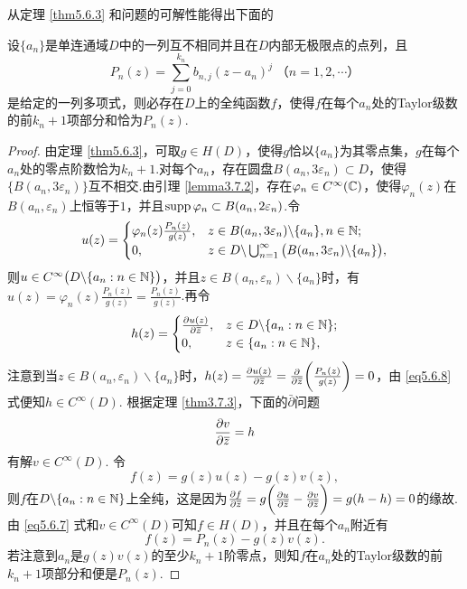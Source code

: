 从定理 \ref{thm5.6.3} 和问题的可解性能得出下面的
\begin{theorem}\label{thm5.6.4}
  设$\{a_n\}$是单连通域$D$中的一列互不相同并且在$D$内部无极限点的点列，且
  \begin{equation}\label{eq5.6.6}
    P_n(z) = \sum_{j=0}^{k_n}b_{n,j}(z-a_n)^j\;\mbox{（$n=1,2,\cdots$）}
  \end{equation}
  是给定的一列多项式，则必存在$D$上的全纯函数$f$，使得$f$在每个$a_n$处的Taylor级数的前$k_n+1$项部分和恰为$P_n(z)$.
\end{theorem}
\begin{proof}
  由定理 \ref{thm5.6.3}，可取$g\in H(D)$，使得$g$恰以$\{a_n\}$为其零点集，$g$在每个$a_n$处的零点阶数恰为$k_n+1$.对每个$a_n$，存在圆盘$B(a_n,3\varepsilon_n)\subset D$，使得$\{B(a_n,3\varepsilon_n)\}$互不相交.由引理 \ref{lemma3.7.2}，存在$\varphi_n\in C^\infty(\mathbb C)$，使得$\varphi_n(z)$在$B(a_n,\varepsilon_n)$上恒等于$1$，并且$\operatorname{supp}\varphi_n\subset B(a_n,2\varepsilon_n)$.令
  \begin{equation}\label{eq5.6.7}
    u(z) = \begin{cases}
     \varphi_n(z)\frac{P_n(z)}{g(z)},&z\in B(a_n,3\varepsilon_n)\backslash\{a_n\},n\in\mathbb N;\\
     0, & z\in D\backslash\bigcup_{n=1}^\infty\big(B(a_n,3\varepsilon_n)\backslash
      \{a_n\}\big),
    \end{cases}
  \end{equation}
  则$u\in C^\infty\big(D\backslash\{a_n:n\in\mathbb N\}\big)$，并且$z\in B(a_n,\varepsilon_n)\backslash\{a_n\}$时，有$u(z)=\varphi_n(z)\frac{P_n(z)}{g(z)}
   =\frac{P_n(z)}{g(z)}$.再令
    \begin{equation} \label{eq5.6.8}
        h(z) = \begin{cases}
        \frac{\partial u(z)}{\partial {}\mkern1mu\overline{\mkern-1muz}}, & z\in D\backslash\{a_n:n\in\mathbb N\};\\
         0, & z\in\{a_n:n\in\mathbb N\},
      \end{cases}
    \end{equation}
  注意到当$z\in B(a_n,\varepsilon_n)\backslash\{a_n\}$时，$h(z)=\frac{\partial u(z)}{\partial {}\mkern1mu\overline{\mkern-1muz}}
  =\frac{\partial }{\partial {}\mkern1mu\overline{\mkern-1muz}}\bigg(\frac{P_n(z)}{g(z)}\bigg)=0$，由 \eqref{eq5.6.8} 式便知$h\in C^\infty(D)$. 根据定理 \ref{thm3.7.3}，下面的$\bar\partial$问题
  \[
    \frac{\partial v}{\partial {}\mkern1mu\overline{\mkern-1muz}} = h
  \]
  有解$v\in C^\infty(D)$. 令
  \[
    f(z) = g(z)u(z) - g(z)v(z),
  \]
  则$f$在$D\backslash\{a_n:n\in\mathbb N\}$上全纯，这是因为$\frac{\partial f}{\partial {}\mkern1mu\overline{\mkern-1muz}}=g\bigg(\frac{\partial u}{\partial {}\mkern1mu\overline{\mkern-1muz}}-\frac{\partial v}{\partial {}\mkern1mu\overline{\mkern-1muz}}\bigg)=g(h-h)=0$的缘故. 由 \eqref{eq5.6.7} 式和$v\in C^\infty(D)$可知$f\in H(D)$，并且在每个$a_n$附近有
  \[
    f(z)  =P_n(z) - g(z)v(z).
  \]
  若注意到$a_n$是$g(z)v(z)$的至少$k_n+1$阶零点，则知$f$在$a_n$处的Taylor级数的前$k_n+1$项部分和便是$P_n(z)$.
\end{proof}

